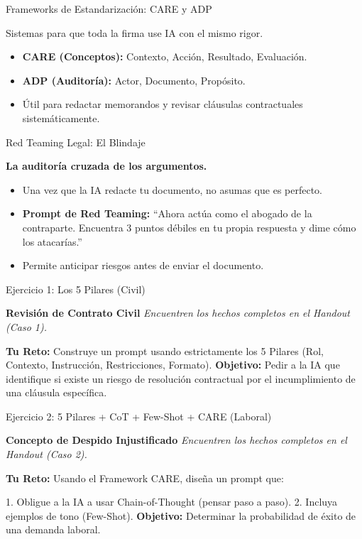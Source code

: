\documentclass[aspectratio=169]{beamer}
\begin{document}
\begin{frame}[fragile]{Frameworks de Estandarización: CARE y ADP}


Sistemas para que toda la firma use IA con el mismo rigor.

\begin{itemize}
  \item \textbf{CARE (Conceptos):} Contexto, Acción, Resultado, Evaluación.
  \item \textbf{ADP (Auditoría):} Actor, Documento, Propósito.
  \item Útil para redactar memorandos y revisar cláusulas contractuales sistemáticamente.
\end{itemize}
\end{frame}



\begin{frame}[fragile]{Red Teaming Legal: El Blindaje}


\textbf{La auditoría cruzada de los argumentos.}

\begin{itemize}
  \item Una vez que la IA redacte tu documento, no asumas que es perfecto.
  \item \textbf{Prompt de Red Teaming:} ``Ahora actúa como el abogado de la contraparte. Encuentra 3 puntos débiles en tu propia respuesta y dime cómo los atacarías.''
  \item Permite anticipar riesgos antes de enviar el documento.
\end{itemize}
\end{frame}



\begin{frame}[fragile]{Ejercicio 1: Los 5 Pilares (Civil)}


\textbf{Revisión de Contrato Civil}
\textit{Encuentren los hechos completos en el Handout (Caso 1).}

\textbf{Tu Reto:} Construye un prompt usando estrictamente los 5 Pilares (Rol, Contexto, Instrucción, Restricciones, Formato).
\textbf{Objetivo:} Pedir a la IA que identifique si existe un riesgo de resolución contractual por el incumplimiento de una cláusula específica.

\end{frame}



\begin{frame}[fragile]{Ejercicio 2: 5 Pilares + CoT + Few-Shot + CARE (Laboral)}


\textbf{Concepto de Despido Injustificado}
\textit{Encuentren los hechos completos en el Handout (Caso 2).}

\textbf{Tu Reto:} Usando el Framework CARE, diseña un prompt que:

1. Obligue a la IA a usar Chain-of-Thought (pensar paso a paso).
2. Incluya ejemplos de tono (Few-Shot).
\textbf{Objetivo:} Determinar la probabilidad de éxito de una demanda laboral.

\end{frame}
\end{document}

